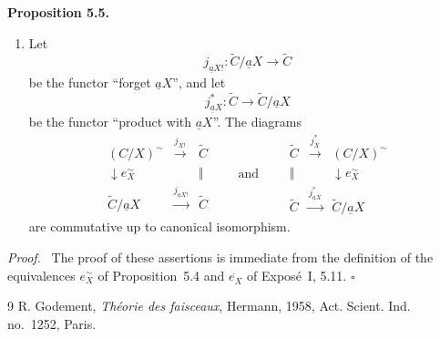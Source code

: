 \documentclass[11pt]{article}
\newcommand{\qedtext}{\hfill\(\square\)}
\newenvironment{statement}[1]{\par\medskip\noindent\textbf{#1.}\ }{\par\medskip}
\newenvironment{prooftext}{\par\noindent\emph{Proof.}\ }{\par\medskip}
\begin{document}
\begin{statement}{Proposition 5.5}
\begin{enumerate}[label=\arabic*)]
\item Let
\[
j_{\underline aX!}:\widetilde C/\underline aX\longrightarrow\widetilde C
\]
be the functor ``forget \(\underline aX\)'', and let
\[
j_{\underline aX}^*:\widetilde C\longrightarrow\widetilde C/\underline aX
\]
be the functor ``product with \(\underline aX\)''. The diagrams
\[
\begin{array}{ccc}
(C/X)^\sim&\xrightarrow{j_{X!}}&\widetilde C\\
\downarrow e_X^\sim&&\Vert\\
\widetilde C/\underline aX&\xrightarrow{j_{\underline aX!}}&\widetilde C
\end{array}
\qquad\text{and}\qquad
\begin{array}{ccc}
\widetilde C&\xrightarrow{j_X^*}&(C/X)^\sim\\
\Vert&&\downarrow e_X^\sim\\
\widetilde C&\xrightarrow{j_{\underline aX}^*}&\widetilde C/\underline aX
\end{array}
\]
are commutative up to canonical isomorphism.
\end{enumerate}
\end{statement}

\begin{prooftext}
The proof of these assertions is immediate from the definition of the equivalences \(e_X^\sim\) of Proposition~5.4 and \(e_X^{\widehat{\ }}\) of Expos\'e~I, 5.11. \qedtext
\end{prooftext}

\begin{thebibliography}{9}
 R. Godement, \emph{Th\'eorie des faisceaux}, Hermann, 1958, Act. Scient. Ind. no.~1252, Paris.
\end{thebibliography}
\end{document}
